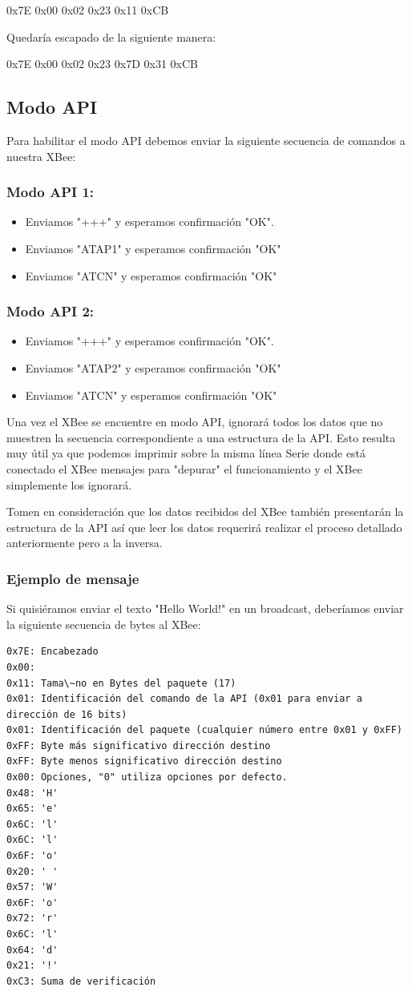 \documentclass[11pt,oneside,spanish,a4paper]{article}
\begin{document}
0x7E 0x00 0x02 0x23 0x11 0xCB

Quedaría escapado de la siguiente manera:

0x7E 0x00 0x02 0x23 0x7D 0x31 0xCB

\subsection{Modo API}
Para habilitar el modo API debemos enviar la siguiente secuencia de comandos a nuestra XBee:
\subsubsection{Modo API 1:}
\begin{itemize}
	\item Enviamos "+++" y esperamos confirmaci\'on "OK".
	\item Enviamos "ATAP1" y esperamos confirmaci\'on "OK"
	\item Enviamos "ATCN" y esperamos confirmaci\'on "OK"
\end{itemize}
\subsubsection{Modo API 2:}
\begin{itemize}
	\item Enviamos "+++" y esperamos confirmaci\'on "OK".
	\item Enviamos "ATAP2" y esperamos confirmaci\'on "OK"
	\item Enviamos "ATCN" y esperamos confirmaci\'on "OK"
\end{itemize}
Una vez el XBee se encuentre en modo API, ignorará todos los datos que no muestren la secuencia correspondiente a una estructura de la API. Esto resulta muy útil ya que podemos imprimir sobre la misma línea Serie donde está conectado el XBee mensajes para "depurar" el funcionamiento y el XBee simplemente los ignorará.

Tomen en consideración que los datos recibidos del XBee también presentarán la estructura de la API así que leer los datos requerirá realizar el proceso detallado anteriormente pero a la inversa.

\subsubsection{Ejemplo de mensaje}
Si quisiéramos enviar el texto "Hello World!" en un broadcast, deberíamos enviar la siguiente secuencia de bytes al XBee:
\begin{lstlisting}[emph={0x7E:,0x00:,0x11:,0x01:,0xFF:,0xFF:,0x00:,
0x48:,0x65:,0x6C:,0x6C:,0x6F:,0x20:,0x57:,0x6F:,0x72:,0x6C:,0x64:,0x21:,
0xC3}, emphstyle={\color{blue}}, label=code:apiEjempl-id]
0x7E: Encabezado
0x00:
0x11: Tama\~no en Bytes del paquete (17)
0x01: Identificación del comando de la API (0x01 para enviar a dirección de 16 bits)
0x01: Identificación del paquete (cualquier número entre 0x01 y 0xFF)
0xFF: Byte más significativo dirección destino
0xFF: Byte menos significativo dirección destino
0x00: Opciones, "0" utiliza opciones por defecto.
0x48: 'H'
0x65: 'e'
0x6C: 'l'
0x6C: 'l'
0x6F: 'o'
0x20: ' '
0x57: 'W'
0x6F: 'o'
0x72: 'r'
0x6C: 'l'
0x64: 'd'
0x21: '!'
0xC3: Suma de verificación
\end{lstlisting}  
\end{document}

